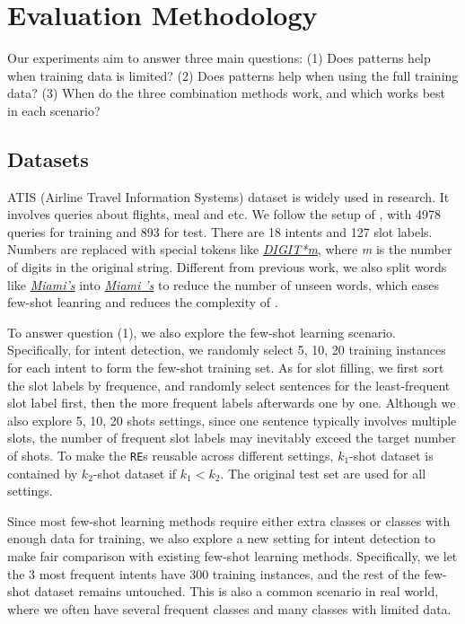 \section{Evaluation Methodology}
Our experiments aim to answer three main questions: (1) Does \RE patterns help when training data is limited? (2) Does \RE patterns help when using the full training data? (3) When do the three combination methods work, and which works best in each scenario?

\subsection{Datasets}
\label{sec_datasest}
ATIS (Airline Travel Information Systems) dataset \cite{hemphill1990atis} is widely used in \NLU research. It involves queries about flights, meal and etc. We follow the setup of \cite{liu2016attention}, with 4978 queries for training and 893 for test. There are 18 intents and 127 slot labels. Numbers are replaced with special tokens like \textsl{\underline{DIGIT*m}}, where \emph{m} is the number of digits in the original string. Different from previous work, we also split words like \textsl{\underline{Miami's}} into \textsl{\underline{Miami 's}} to reduce the number of unseen words, which eases few-shot leanring and reduces the complexity of \RE.

To answer question (1), we also explore the few-shot learning scenario. Specifically, for intent detection, we randomly select 5, 10, 20 training instances for each intent to form the few-shot training set. As for slot filling, we first sort the slot labels by frequence, and randomly select sentences for the least-frequent slot label first, then the more frequent labels afterwards one by one. Although we also explore 5, 10, 20 shots settings, since one sentence typically involves multiple slots, the number of frequent slot labels may inevitably exceed the target number of shots.
To make the \texttt{RE}s reusable across different settings, $k_1$-shot dataset is contained by $k_2$-shot dataset if $k_1 < k_2$. 
The original test set are used for all settings.

Since most few-shot learning methods require either extra classes or classes with enough data for training, we also explore a new setting for intent detection to make fair comparison with existing few-shot learning methods. Specifically, we let the 3 most frequent intents have 300 training instances, and the rest of the few-shot dataset remains untouched.
This is also a common scenario in real world, where we often have several frequent classes and many classes with limited data.

